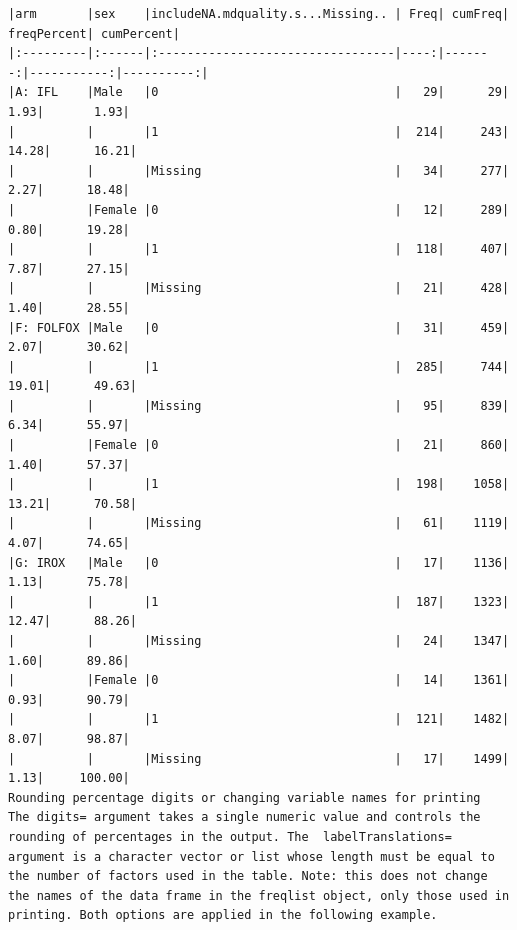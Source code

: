 \documentclass[
]{book}
\begin{document}
\begin{verbatim}
|arm       |sex    |includeNA.mdquality.s...Missing.. | Freq| cumFreq| freqPercent| cumPercent|
|:---------|:------|:---------------------------------|----:|-------:|-----------:|----------:|
|A: IFL    |Male   |0                                 |   29|      29|        1.93|       1.93|
|          |       |1                                 |  214|     243|       14.28|      16.21|
|          |       |Missing                           |   34|     277|        2.27|      18.48|
|          |Female |0                                 |   12|     289|        0.80|      19.28|
|          |       |1                                 |  118|     407|        7.87|      27.15|
|          |       |Missing                           |   21|     428|        1.40|      28.55|
|F: FOLFOX |Male   |0                                 |   31|     459|        2.07|      30.62|
|          |       |1                                 |  285|     744|       19.01|      49.63|
|          |       |Missing                           |   95|     839|        6.34|      55.97|
|          |Female |0                                 |   21|     860|        1.40|      57.37|
|          |       |1                                 |  198|    1058|       13.21|      70.58|
|          |       |Missing                           |   61|    1119|        4.07|      74.65|
|G: IROX   |Male   |0                                 |   17|    1136|        1.13|      75.78|
|          |       |1                                 |  187|    1323|       12.47|      88.26|
|          |       |Missing                           |   24|    1347|        1.60|      89.86|
|          |Female |0                                 |   14|    1361|        0.93|      90.79|
|          |       |1                                 |  121|    1482|        8.07|      98.87|
|          |       |Missing                           |   17|    1499|        1.13|     100.00|
Rounding percentage digits or changing variable names for printing
The digits= argument takes a single numeric value and controls the rounding of percentages in the output. The  labelTranslations= argument is a character vector or list whose length must be equal to the number of factors used in the table. Note: this does not change the names of the data frame in the freqlist object, only those used in printing. Both options are applied in the following example.


\end{verbatim}
\end{document}

